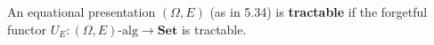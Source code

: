 An equational presentation $(\Omega, E)$ (as in 5.34) is \textbf{tractable} if the forgetful functor $U_E: (\Omega, E)\text{-alg} \longrightarrow \mathbf{Set}$ is tractable.
